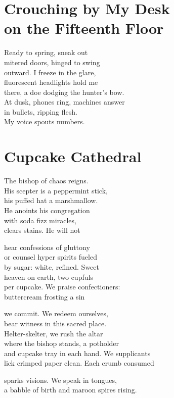\documentclass[twoside,10pt]{book}
\begin{document}
\clearpage
\section{Crouching by My Desk\\ on the Fifteenth Floor}

Ready to spring, sneak out\\
mitered doors, hinged to swing\\
outward. I freeze in the glare,\\
fluorescent headlights hold me\\
there, a doe dodging the hunter's bow.\\
At dusk, phones ring, machines answer\\
in bullets, ripping flesh.\\
My voice spouts numbers.


\clearpage
\section{Cupcake Cathedral}

The bishop of chaos reigns.\\
His scepter is a peppermint stick,\\
his puffed hat a marshmallow.\\
He anoints his congregation\\
with soda fizz miracles,\\
clears stains. He will not

hear confessions of gluttony\\
or counsel hyper spirits fueled\\
by sugar: white, refined. Sweet\\
heaven on earth, two cupfuls\\
per cupcake. We praise confectioners:\\
buttercream frosting a sin

we commit. We redeem ourselves,\\
bear witness in this sacred place.\\
Helter-skelter, we rush the altar\\
where the bishop stands, a potholder\\
and cupcake tray in each hand. We supplicants\\
lick crimped paper clean. Each crumb consumed

sparks visions. We speak in tongues,\\
a babble of birth and maroon spires rising.
\end{document}
